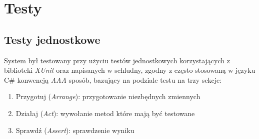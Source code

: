 \documentclass[eng,printmode,openany]{mgr}
\begin{document}
	
	\newpage
	\chapter{Testy}
	\section{Testy jednostkowe}
	System był testowany przy użyciu testów jednostkowych korzystających z biblioteki \textit{XUnit} oraz napisanych w schludny, zgodny z często stosowaną w języku C\# konwencją \textit{AAA} sposób, bazujący na podziale testu na trzy sekcje:
	\begin{enumerate}
		\item Przygotuj (\textit{Arrange}): przygotowanie niezbędnych zmiennych
		\item Działaj (\textit{Act}): wywołanie metod które mają być testowane 
		\item Sprawdź (\textit{Assert}): sprawdzenie wyniku 
	\end{enumerate}
	
	
	
	\newpage
\end{document}
